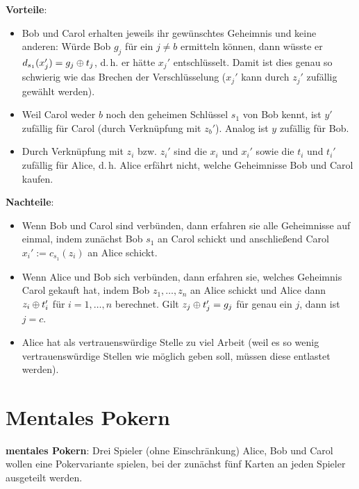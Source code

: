 \textbf{Vorteile}:
\begin{itemize}
    \item
    Bob und Carol erhalten jeweils ihr gewünschtes Geheimnis und keine anderen:
    Würde Bob $g_j$ für ein $j \not= b$ ermitteln können, dann wüsste er
    $d_{s_1}(x_j') = g_j \oplus t_j$, d.\,h. er hätte $x_j'$ entschlüsselt.
    Damit ist dies genau so schwierig wie das Brechen der Verschlüsselung
    ($x_j'$ kann durch $z_j'$ zufällig gewählt werden).

    \item
    Weil Carol weder $b$ noch den geheimen Schlüssel $s_1$ von Bob kennt,
    ist $y'$ zufällig für Carol (durch Verknüpfung mit $z_b'$).
    Analog ist $y$ zufällig für Bob.

    \item
    Durch Verknüpfung mit $z_i$ bzw. $z_i'$ sind die $x_i$ und $x_i'$
    sowie die $t_i$ und $t_i'$ zufällig für Alice,
    d.\,h. Alice erfährt nicht, welche Geheimnisse Bob und Carol kaufen.
\end{itemize}

\textbf{Nachteile}:
\begin{itemize}
    \item
    Wenn Bob und Carol sind verbünden, dann erfahren sie alle Geheimnisse auf einmal,
    indem zunächst Bob $s_1$ an Carol schickt und
    anschließend Carol $x_i' := c_{s_1}(z_i)$ an Alice schickt.

    \item
    Wenn Alice und Bob sich verbünden, dann erfahren sie, welches Geheimnis Carol gekauft hat,
    indem Bob $z_1, \dotsc, z_n$ an Alice schickt
    und Alice dann $z_i \oplus t_i'$ für $i = 1, \dotsc, n$ berechnet.
    Gilt $z_j \oplus t_j' = g_j$ für genau ein $j$, dann ist $j = c$.

    \item
    Alice hat als vertrauenswürdige Stelle zu viel Arbeit
    (weil es so wenig vertrauenswürdige Stellen wie möglich geben soll,
    müssen diese entlastet werden).
\end{itemize}

\pagebreak

\section{%
    Mentales Pokern%
}

\textbf{mentales Pokern}:
Drei Spieler (ohne Einschränkung) Alice, Bob und Carol wollen eine Pokervariante spielen,
bei der zunächst fünf Karten an jeden Spieler ausgeteilt werden.

